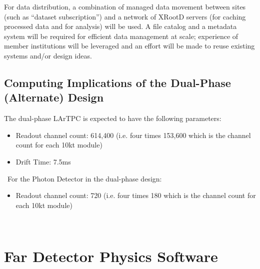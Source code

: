For data distribution, a combination of managed data movement between sites (such as ``dataset subscription'')
and a network of XRootD servers (for caching processed data and for analysis) will be used.
A file catalog and a metadata system will be required for efficient data management at scale; %
experience of
member institutions will be leveraged and %
an effort will be made to reuse existing systems and/or design ideas. %

\subsection{Computing Implications of the Dual-Phase (Alternate) Design}
\label{sec:detectors-sc-alternate}
The dual-phase LArTPC is expected to have the following parameters:
\begin{itemize}
	\item Readout channel count: 614,400 (i.e. four times 153,600 which is the channel count
	for each 10kt module)
	\item Drift Time: 7.5ms
\end{itemize}
\
For the Photon Detector in the dual-phase design:
\begin{itemize}
	\item Readout channel count: 720 (i.e. four times 180 which is the channel count
	for each 10kt module)
\end{itemize}
\


\section{Far Detector Physics Software}
\label{sec:detectors-sc-physics-software}



